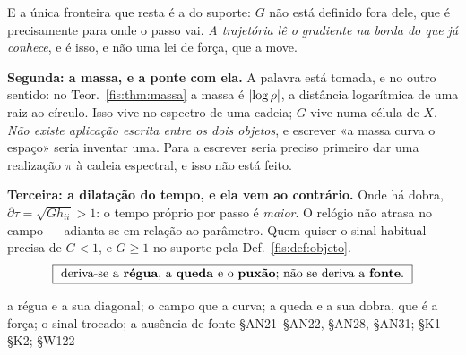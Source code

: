 \documentclass[livro.tex]{subfiles}
\begin{document}
\medskip\noindent E a única fronteira que resta é a do suporte: $G$ não está
definido fora dele, que é precisamente para onde o passo vai. \emph{A trajetória
lê o gradiente na borda do que já conhece}, e é isso, e não uma lei de força, que
a move.

\medskip\noindent\textbf{Segunda: a massa, e a ponte com ela.} A palavra está
tomada, e no outro sentido: no Teor.~\ref{fis:thm:massa} a massa é
$\lvert \log\rho\rvert$, a distância logarítmica de uma raiz ao círculo. Isso vive no
espectro de uma cadeia; $G$ vive numa célula de $X$. \emph{Não existe aplicação
escrita entre os dois objetos}, e escrever «a massa curva o espaço» seria
inventar uma. Para a escrever seria preciso primeiro dar uma realização
$\pi$ à cadeia espectral, e isso não está feito.

\medskip\noindent\textbf{Terceira: a dilatação do tempo, e ela vem ao contrário.}
Onde há dobra, $\partial\tau=\sqrt{G h_{ii}}>1$: o tempo próprio por passo é
\emph{maior}. O relógio não atrasa no campo --- adianta-se em relação ao
parâmetro. Quem quiser o sinal habitual precisa de $G<1$, e $G\ge1$ no suporte
pela Def.~\ref{fis:def:objeto}.
\[
\boxed{\ \text{deriva-se a \textbf{régua}, a \textbf{queda} e o \textbf{puxão}; não se deriva a \textbf{fonte}.}\ }
\]


        {a régua e a sua diagonal; o campo que a curva; a queda e a sua dobra, que é a força; o sinal trocado; a ausência de fonte}
        { §AN21--§AN22, §AN28, §AN31;  §K1--§K2;  §W122}
\end{document}

